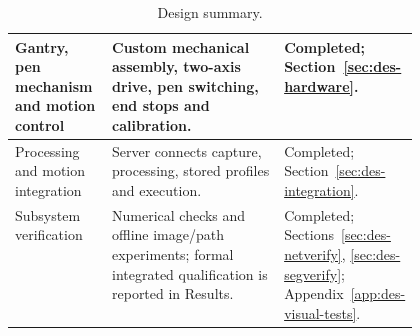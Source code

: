 \begin{table}[!htbp]
\begin{tabularx}{\linewidth}{|>{\raggedright\arraybackslash}p{0.24\linewidth}|>{\raggedright\arraybackslash}X|>{\raggedright\arraybackslash}p{0.23\linewidth}|}
Gantry, pen mechanism and motion control&Custom mechanical assembly, two-axis drive, pen switching, end stops and calibration.&Completed; Section~\ref{sec:des-hardware}.\\\hline
Processing and motion integration&Server connects capture, processing, stored profiles and execution.&Completed; Section~\ref{sec:des-integration}.\\\hline
Subsystem verification&Numerical checks and offline image/path experiments; formal integrated qualification is reported in Results.&Completed; Sections~\ref{sec:des-netverify}, \ref{sec:des-segverify}; Appendix~\ref{app:des-visual-tests}.\\\hline
\end{tabularx}
\caption{Design summary.}
\label{tab:des-summary}
\end{table}

\FloatBarrier
